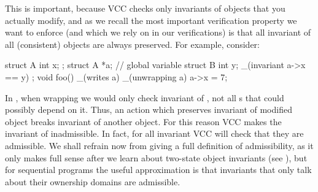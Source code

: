 This is important, because VCC checks only invariants of objects
that you actually modify, and as we recall the most important
verification property we want to enforce (and which we rely on in our
verifications) is that all invariant of all (consistent) objects 
are always preserved.
For example, consider:

\begin{VCC}
struct A { 
  int x;
};
struct A *a; // global variable
struct B {
  int y;
  _(invariant a->x == y)
};
void foo()
  _(writes a)
{
  _(unwrapping a) {
    a->x = 7;
  }
}
\end{VCC}

\noindent
In , when wrapping  we would only check invariant
of , not all s that could possibly depend on it.
Thus, an action which preserves invariant of modified object breaks invariant of another object.
For this reason VCC makes the invariant of  inadmissible.
In fact, for all invariant VCC will check that they are admissible.
We shall refrain now from giving a full definition of admissibility, as 
it only makes full sense after we learn about two-state object invariants
(see ), but for sequential programs the useful approximation
is that invariants that only talk about their ownership domains are admissible.


